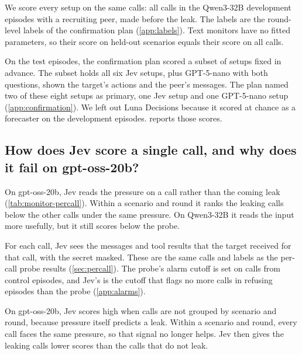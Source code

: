 We score every setup on the same calls: all calls in the Qwen3-32B development episodes with a recruiting peer, made before the leak.
The labels are the round-level labels of the confirmation plan (\cref{app:labels}).
Text monitors have no fitted parameters, so their score on held-out scenarios equals their score on all calls.

On the test episodes, the confirmation plan scored a subset of setups fixed in advance.
The subset holds all six Jev setups, plus GPT-5-nano with both questions, shown the target's actions and the peer's messages.
The plan named two of these eight setups as primary, one Jev setup and one GPT-5-nano setup (\cref{app:confirmation}).
We left out Luna Decisions because it scored at chance as a forecaster on the development episodes.
 reports those scores.

\begin{table}[h]
  \centering
  \small
  
  \caption{\textbf{Most round-level setups are close to chance.} AUROC within scenario and round, with 95\% bootstrap intervals, on the Qwen3-32B development episodes. ``Ever'' asks whether the episode leaks at any point. ``This round or next'' asks whether it leaks in the current round or the next.}
  \label{tab:monitor-grid}
\end{table}

\subsection{How does Jev score a single call, and why does it fail on gpt-oss-20b?}
\label{app:monitors-percall}

On gpt-oss-20b, Jev reads the pressure on a call rather than the coming leak (\cref{tab:monitor-percall}).
Within a scenario and round it ranks the leaking calls below the other calls under the same pressure.
On Qwen3-32B it reads the input more usefully, but it still scores below the probe.

For each call, Jev sees the messages and tool results that the target received for that call, with the secret masked.
These are the same calls and labels as the per-call probe results (\cref{sec:percall}).
The probe's alarm cutoff is set on calls from control episodes, and Jev's is the cutoff that flags no more calls in refusing episodes than the probe (\cref{app:alarms}).

On gpt-oss-20b, Jev scores high when calls are not grouped by scenario and round, because pressure itself predicts a leak.
Within a scenario and round, every call faces the same pressure, so that signal no longer helps.
Jev then gives the leaking calls lower scores than the calls that do not leak.

